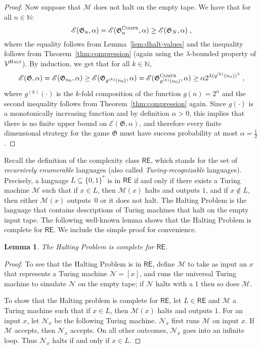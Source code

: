 \documentclass[11pt]{article}
\newtheorem{lemma}[theorem]{Lemma}
\theoremstyle{definition}
\newcommand{\N}{\ensuremath{\mathbb{N}}}
\newcommand{\game}{\mathfrak{G}}
\newcommand{\verifier}{\mathcal{V}}
\newcommand{\class}[1]{\ensuremath{\mathsf{#1}}\xspace}
\newcommand{\RE}{\class{RE}} %
\newcommand{\Ent}{\mathscr{E}}
\newcommand{\compr}{\textsc{Compr}}
\newcommand{\halt}{\textsc{Halt}}
\newcommand{\machine}{\cal{M}}
\renewcommand{\cal}[1]{\mathcal{#1}}
\begin{document}
\begin{proof}
	Now suppose that $\machine$ does not halt on the empty tape.
  We have that for all $n \in \N$:
	\[
		\Ent(\game_n,\alpha) = \Ent(\game^\compr_n,\alpha) \geq
    \Ent(\game_{N},\alpha)\;,
	\]
	where the equality follows from Lemma~\ref{lem:dhalt-values} and the
  inequality follows from Theorem~\ref{thm:compression} (again using the
  $\lambda$-bounded property of $\verifier^\halt$).
  By induction, we get that for all $k \in \N$,
	\[
		\Ent(\game,\alpha) = \Ent(\game_{n_0}, \alpha) \geq
    \Ent(\game_{g^{(k)}(n_0)},\alpha) =
    \Ent(\game^\compr_{g^{(k)}(n_0)},\alpha) \geq
    \alpha 2^{\lambda (g^{(k)}(n_0))^\lambda }\;,
	\]
	where $g^{(k)}(\cdot)$ is the $k$-fold composition of the function $g(n) =
  2^{n}$ and the second inequality follows from Theorem~\ref{thm:compression}
  again.
  Since $g(\cdot)$ is a monotonically increasing function and by definition
  $\alpha > 0$, this implies that there is no finite upper bound on
  $\Ent(\game,\alpha)$, and therefore every finite dimensional strategy for the
  game $\game$ must have success probability at most $\alpha = \frac{1}{2}$.
\end{proof}

Recall the definition of the complexity class $\mathsf{RE}$, which stands for
the set of \emph{recursively enumerable} languages (also called
\emph{Turing-recognizable} languages).
Precisely, a language $L \subseteq \{0,1\}^*$ is in $\RE$ if and only if there
exists a Turing machine $\cal{M}$ such that if $x \in L$, then $\cal{M}(x)$
halts and outputs $1$, and if $x \notin L$, then either $\cal{M}(x)$ outputs~$0$
or it does not halt.
The Halting Problem is the language that contains descriptions of Turing
machines that halt on the empty input tape.
The following well-known lemma shows that the Halting Problem is complete for
$\RE$.
We include the simple proof for convenience. 

\begin{lemma}
  The Halting Problem is complete for $\RE$.
\end{lemma}

\begin{proof}
  To see that the Halting Problem is in $\RE$, define $\cal{M}$ to take as input
  an $x$ that represents a Turing machine $\cal{N} = [x]$, and runs the
  universal Turing machine to simulate $\cal{N}$ on the empty tape; if $\cal{N}$
  halts with a $1$ then so does $\cal{M}$.

  To show that the Halting problem is complete for $\RE$, let $L\in \RE$ and
  $\cal{M}$ a Turing machine such that if $x \in L$, then $\cal{M}(x)$ halts and
  outputs $1$.
  For an input $x$, let $\cal{N}_x$ be the following Turing machine.
  $\cal{N}_x$ first runs $\cal{M}$ on input $x$.
  If $\cal{M}$ accepts, then $\cal{N}_x$ accepts.
  On all other outcomes, $\cal{N}_x$ goes into an infinite loop.
  Thus $\cal{N}_x$ halts if and only if $x \in L$. 
\end{proof}
\end{document}
